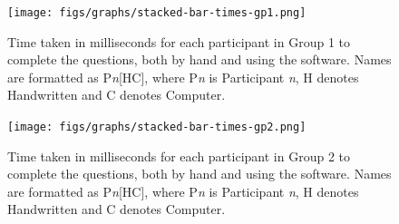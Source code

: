\documentclass[12pt,twoside,notitlepage,xetex]{report}
\begin{document}
{%
%
\begin{center}
\begin{figure}[H]
\begin{center}
\texttt{[image: figs/graphs/stacked-bar-times-gp1.png]}
\end{center}
\caption{Time taken in milliseconds for each participant in Group 1 to complete the questions, both by hand and using the software.  Names are formatted as P\emph{n}[HC], where P\emph{n} is Participant \emph{n}, H denotes Handwritten and C denotes Computer.}
\label{fig:StacksGp1}
\end{figure}
\end{center}

\begin{center}
\begin{figure}[H]
\begin{center}
\texttt{[image: figs/graphs/stacked-bar-times-gp2.png]}
\end{center}
\caption{Time taken in milliseconds for each participant in Group 2 to complete the questions, both by hand and using the software.  Names are formatted as P\emph{n}[HC], where P\emph{n} is Participant \emph{n}, H denotes Handwritten and C denotes Computer.}
\label{fig:StacksGp2}
\end{figure}
\end{center}

}
\end{document}

